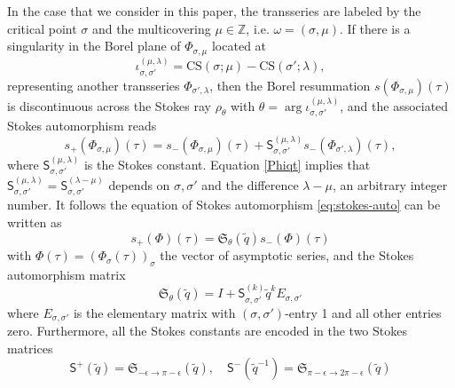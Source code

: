 \documentclass[12pt,reqno]{amsart}
\theoremstyle{definition}
\def\IZ{\mathbb{Z}}
\def\s{\sigma}
\def\tq{\tilde{q}}
\def\mf{\mathfrak}
\def\ms{\mathsf}
\begin{document}
In the case that we consider in this paper, the transseries are labeled 
by the critical point $\sigma$ and the multicovering $\mu \in \IZ$, i.e.
$\omega=(\s, \mu)$. If there is a singularity in the Borel plane of
$\Phi_{\s,\mu}$ located at
\begin{equation}
  \iota_{\s,\s'}^{(\mu,\lambda)} = \text{CS}(\s;\mu) - \text{CS}(\s';\lambda),
\end{equation}
representing another transseries $\Phi_{\s',\lambda}$, then the Borel
resummation %
$s(\Phi_{\s,\mu})(\tau)$ %
is discontinuous across the Stokes ray $\rho_{\theta}$ with
$\theta = \arg \iota_{\s,\s'}^{(\mu,\lambda)}$, and the associated
Stokes automorphism reads
\begin{equation}
  s_{+}(\Phi_{\s,\mu})(\tau) =
  s_{-}(\Phi_{\s,\mu})(\tau)
  + \ms{S}_{\s,\s'}^{(\mu,\lambda)}
  s_{-}(\Phi_{\s',\lambda})(\tau),
  \label{eq:stokes-auto}
\end{equation}
where %
$\ms{S}_{\s,\s'}^{(\mu,\lambda)}$ is the Stokes constant.  Equation
\eqref{Phiqt} implies that
$\ms{S}_{\s,\s'}^{(\mu,\lambda)} = \ms{S}_{\s,\s'}^{(\lambda-\mu)}$
depends on $\s,\s'$ and the difference $\lambda-\mu$, an arbitrary
integer number.  It follows the equation of Stokes automorphism
\eqref{eq:stokes-auto} can be written as
\begin{equation}
  s_{+}(\Phi)(\tau) = \mf{S}_{\theta}(\tq)
  s_{-}(\Phi)(\tau)
  \label{eq:Sauto-mat}
\end{equation}
with $\Phi(\tau)=(\Phi_\s(\tau))_\s$ the vector of asymptotic series,
and the Stokes automorphism matrix
\begin{equation}
  \mf{S}_{\theta}(\tq) = I + \ms{S}_{\s,\s'}^{(k)}\tq^k E_{\s,\s'}
  \label{eq:Sth}
\end{equation}
where $E_{\s,\s'}$ is the elementary matrix with $(\s,\s')$-entry 1
and all other entries zero.  Furthermore, all the Stokes constants are
encoded in the two Stokes matrices
\begin{equation}
  \ms{S}^+(\tq) = \mf{S}_{-\epsilon \to \pi-\epsilon}(\tq),\quad
  \ms{S}^-(\tq^{-1}) = \mf{S}_{\pi-\epsilon\to 2\pi-\epsilon}(\tq)
  \label{eq:Spn}
\end{equation}
\end{document}
